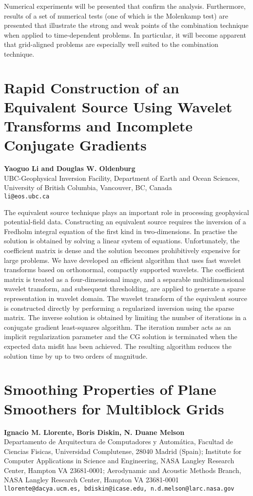 \documentclass[11pt]{article}
\newcommand{\nextab}[4]{
	\section{#2}
	{\bf #1} \\ \nopagebreak
	{#3} \\ \nopagebreak
	{\tt #4} \nopagebreak
	}
\begin{document}
Numerical experiments will be presented that confirm the analysis.
Furthermore,
results of a set of numerical tests (one of which is the Molenkamp test) are
presented that illustrate the strong and weak points of the combination
technique when applied to time-dependent problems. In particular, it will
become apparent that grid-aligned problems are especially well suited to the
combination technique.


\nextab{Yaoguo Li and Douglas W. Oldenburg}
	{Rapid Construction of an Equivalent Source Using
	Wavelet Transforms and Incomplete Conjugate Gradients}
	{UBC-Geophysical Inversion Facility,
	Department of Earth and Ocean Sciences,
	University of British Columbia,
	Vancouver, BC, Canada}
	{li@eos.ubc.ca}

The equivalent source technique plays an important role in
processing geophysical potential-field data. Constructing an
equivalent source requires the inversion of a Fredholm integral
equation of the first kind in two-dimensions. In practise the
solution is obtained by solving a  linear system of equations.
Unfortunately, the  coefficient matrix is dense and the
solution becomes prohibitively expensive for large problems. We have
developed an efficient algorithm that uses fast wavelet transforms
based on orthonormal, compactly supported wavelets. The coefficient
matrix is treated as a four-dimensional image, and a separable
multidimensional wavelet transform, and subsequent thresholding, are
applied to generate a sparse representation in wavelet domain.
The wavelet transform of the equivalent source is constructed
directly by performing a regularized inversion using the sparse matrix.
The inverse solution is obtained by limiting
the number of iterations in a conjugate gradient least-squares algorithm.
The iteration number acts as an implicit regularization parameter and
the CG solution is terminated when the expected data misfit has been
achieved.  The resulting algorithm reduces the solution time by up to
two orders of magnitude.




\nextab{Ignacio M. Llorente, Boris Diskin, N. Duane Melson}
	{Smoothing Properties of Plane Smoothers for Multiblock Grids}
	{Departamento de Arquitectura de Computadores y Autom\'atica,
	Facultad de Ciencias Fisicas, Universidad Complutense,
	28040 Madrid (Spain);
	Institute for Computer Applications in Science and Engineering,
	NASA Langley Research Center, Hampton VA 23681-0001;
	Aerodynamic and Acoustic Methods Branch,
	NASA Langley Research Center, Hampton VA 23681-0001}
	{llorente@dacya.ucm.es, bdiskin@icase.edu, n.d.melson@larc.nasa.gov}
\end{document}

